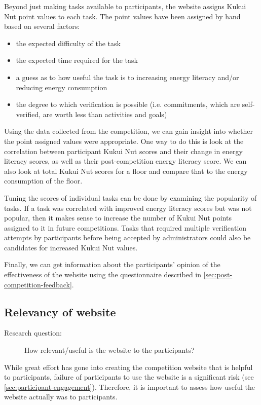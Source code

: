 Beyond just making tasks available to participants, the website assigns Kukui Nut point values to each task. The point values have been assigned by hand based on several factors:

\begin{itemize}
\item the expected difficulty of the task
\item the expected time required for the task
\item a guess as to how useful the task is to increasing energy literacy and/or reducing energy consumption
\item the degree to which verification is possible (i.e. commitments, which are self-verified, are worth less than activities and goals)
\end{itemize}

Using the data collected from the competition, we can gain insight into whether the point assigned values were appropriate. One way to do this is look at the correlation between participant Kukui Nut scores and their change in energy literacy scores, as well as their post-competition energy literacy score. We can also look at total Kukui Nut scores for a floor and compare that to the energy consumption of the floor.

Tuning the scores of individual tasks can be done by examining the popularity of tasks. If a task was correlated with improved energy literacy scores but was not popular, then it makes sense to increase the number of Kukui Nut points assigned to it in future competitions. Tasks that required multiple verification attempts by participants before being accepted by administrators could also be candidates for increased Kukui Nut values.

Finally, we can get information about the participants' opinion of the effectiveness of the website using the questionnaire described in \autoref{sec:post-competition-feedback}.

\subsection{Relevancy of website}

\begin{description}
\item[Research question:] How relevant/useful is the website to the participants?
\end{description}

While great effort has gone into creating the competition website that is helpful to participants, failure of participants to use the website is a significant risk (see \autoref{sec:participant-engagement}). Therefore, it is important to assess how useful the website actually was to participants.

